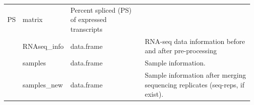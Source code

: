\documentclass[]{article}
\begin{document}
\begin{longtable}[]{@{}llll@{}}
\begin{minipage}[t]{0.06\columnwidth}
PS\strut
\end{minipage} & \begin{minipage}[t]{0.04\columnwidth}\raggedright\strut
matrix\strut
\end{minipage} & \begin{minipage}[t]{0.71\columnwidth}\raggedright\strut
Percent spliced (PS) of expressed transcripts\strut
\end{minipage}\tabularnewline
\begin{minipage}[t]{0.08\columnwidth}\raggedright\strut
\strut
\end{minipage} & \begin{minipage}[t]{0.06\columnwidth}\raggedright\strut
RNAseq\_info\strut
\end{minipage} & \begin{minipage}[t]{0.04\columnwidth}\raggedright\strut
data.frame\strut
\end{minipage} & \begin{minipage}[t]{0.71\columnwidth}\raggedright\strut
RNA-seq data information before and after pre-processing\strut
\end{minipage}\tabularnewline
\begin{minipage}[t]{0.08\columnwidth}\raggedright\strut
\strut
\end{minipage} & \begin{minipage}[t]{0.06\columnwidth}\raggedright\strut
samples\strut
\end{minipage} & \begin{minipage}[t]{0.04\columnwidth}\raggedright\strut
data.frame\strut
\end{minipage} & \begin{minipage}[t]{0.71\columnwidth}\raggedright\strut
Sample information.\strut
\end{minipage}\tabularnewline
\begin{minipage}[t]{0.08\columnwidth}\raggedright\strut
\strut
\end{minipage} & \begin{minipage}[t]{0.06\columnwidth}\raggedright\strut
samples\_new\strut
\end{minipage} & \begin{minipage}[t]{0.04\columnwidth}\raggedright\strut
data.frame\strut
\end{minipage} & \begin{minipage}[t]{0.71\columnwidth}\raggedright\strut
Sample information after merging sequencing replicates (seq-reps, if
exist).\strut
\end{minipage}\tabularnewline

\end{longtable}
\end{document}
